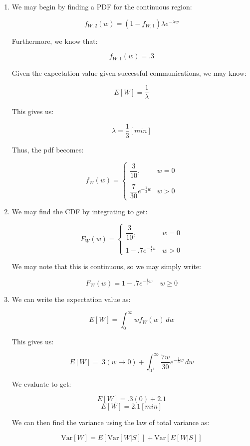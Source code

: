 \begin{enumerate}
\begin{enumerate}
      \item We may begin by finding a PDF for the continuous region:

        $$f_{W,2}(w)=(1-f_{W,1})\lambda e^{-\lambda w}$$

        Furthermore, we know that:

        $$f_{W,1}(w)=.3$$

        Given the expectation value given successful communications, we may know:

        $$E[W]=\frac{1}{\lambda}$$

        This gives us:

        $$\lambda=\frac{1}{3}[\si{min}]$$

        Thus, the pdf becomes:

        $$\boxed{f_{W}(w)=\left\{\begin{array}{ll} \dfrac{3}{10}, & w=0\\\\ \dfrac{7}{30}e^{-\frac{1}{3}w} & w>0 \end{array}}$$

      \item We may find the CDF by integrating to get:

        $$F_{W}(w)=\left\{\begin{array}{ll} \dfrac{3}{10}, & w=0\\\\ 1-.7e^{-\frac{1}{3}w} & w>0 \end{array}$$

        We may note that this is continuous, so we may simply write:

        $$\boxed{F_{W}(w)=1-.7e^{-\frac{1}{3}w}\quad w\geq 0}$$

      \item We can write the expectation value as:

        $$E[W]=\int_{0}^{\infty} wf_W(w)\,dw$$

        This gives us:

        $$E[W]=.3(w\to0)+\int_{0^+}^{\infty} \frac{7w}{30}e^{-\frac{1}{3}w}\,dw$$

        We evaluate to get:

        $$E[W]=.3(0)+2.1$$
        $$\boxed{E[W]=2.1[\si{min}]}$$

        We can then find the variance using the law of total variance as:

        $$\text{Var}[W]=E[\text{Var}[W|S]]+\text{Var}[E[W|S]]$$


\end{enumerate}
\end{enumerate}
